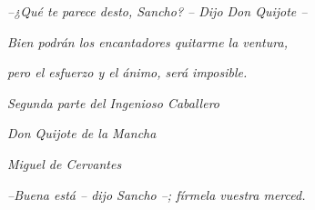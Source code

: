 %
%
%
%
%
%
%
%
%
%
%
%


\ifpdf
\fi

\thispagestyle{empty}\mbox{}

\vspace*{4cm}

\small

\hfill \emph{--¿Qué te parece desto, Sancho? -- Dijo Don Quijote --}

\hfill \emph{Bien podrán los encantadores quitarme la ventura,}

\hfill \emph{pero el esfuerzo y el ánimo, será imposible.}

\hfill 

\hfill \emph{Segunda parte del Ingenioso Caballero} 

\hfill \emph{Don Quijote de la Mancha}

\hfill \emph{Miguel de Cervantes}

\vfill%

\hfill \emph{--Buena está -- dijo Sancho --; fírmela vuestra merced.}


